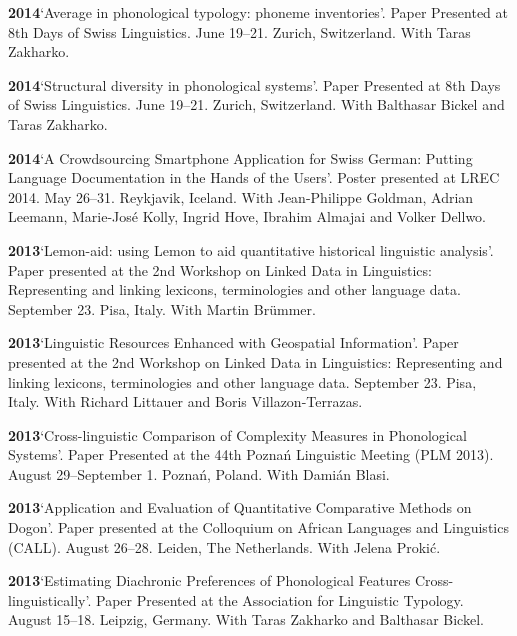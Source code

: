 \documentclass[11pt]{article}
\newcommand{\hangpara}{
 \setlength{\parindent}{0in} %
 \hangindent=0.42in %
}
\begin{document}
\vskip 6pt
\hangpara
{\bf 2014}\hspace{1ex}`Average in phonological typology: phoneme inventories'. Paper Presented at 8th Days of Swiss Linguistics. June 19--21. Zurich, Switzerland. With Taras Zakharko.

\vskip 6pt
\hangpara
{\bf 2014}\hspace{1ex}`Structural diversity in phonological systems'. Paper Presented at 8th Days of Swiss Linguistics. June 19--21. Zurich, Switzerland. With Balthasar Bickel and Taras Zakharko.

\vskip 6pt
\hangpara
{\bf 2014}\hspace{1ex}`A Crowdsourcing Smartphone Application for Swiss German: Putting Language Documentation in the Hands of the Users'. Poster presented at LREC 2014. May 26--31. Reykjavik, Iceland. With Jean-Philippe Goldman, Adrian Leemann, Marie-Jos{\'e} Kolly, Ingrid Hove, Ibrahim Almajai and Volker Dellwo.

\vskip 6pt
\hangpara
{\bf 2013}\hspace{1ex}`Lemon-aid: using Lemon to aid quantitative historical linguistic analysis'. Paper presented at the 2nd Workshop on Linked Data in Linguistics: Representing and linking lexicons, terminologies and other language data. September 23. Pisa, Italy. With Martin Br{\"u}mmer. 

\vskip 6pt
\hangpara
{\bf 2013}\hspace{1ex}`Linguistic Resources Enhanced with Geospatial Information'. Paper presented at the 2nd Workshop on Linked Data in Linguistics: Representing and linking lexicons, terminologies and other language data. September 23. Pisa, Italy. With Richard Littauer and Boris Villazon-Terrazas.

\vskip 6pt
\hangpara
{\bf 2013}\hspace{1ex}`Cross-linguistic Comparison of Complexity Measures in Phonological Systems'. Paper Presented at the 44th Pozna{\'n} Linguistic Meeting (PLM 2013). August 29--September 1. Pozna{\'n}, Poland. With Dami{\'a}n Blasi.

\vskip 6pt
\hangpara
{\bf 2013}\hspace{1ex}`Application and Evaluation of Quantitative Comparative Methods on Dogon'. Paper presented at the Colloquium on African Languages and Linguistics (CALL). August 26--28. Leiden, The Netherlands. With Jelena Proki{\'c}.

\vskip 6pt
\hangpara
{\bf 2013}\hspace{1ex}`Estimating Diachronic Preferences of Phonological Features Cross-linguistically'. Paper Presented at the Association for Linguistic Typology. August 15--18. Leipzig, Germany. With Taras Zakharko and Balthasar Bickel.
\end{document}
